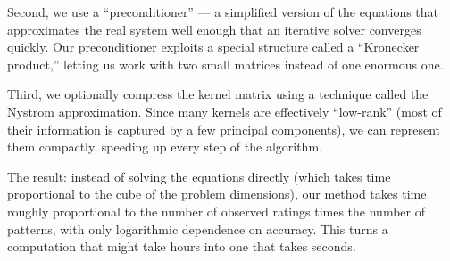 Second, we use a ``preconditioner'' --- a simplified version of the equations that
approximates the real system well enough that an iterative solver converges quickly.
Our preconditioner exploits a special structure called a ``Kronecker product,''
letting us work with two small matrices instead of one enormous one.

Third, we optionally compress the kernel matrix using a technique called the
Nystrom approximation. Since many kernels are effectively ``low-rank'' (most of
their information is captured by a few principal components), we can represent
them compactly, speeding up every step of the algorithm.

The result: instead of solving the equations directly (which takes time
proportional to the cube of the problem dimensions), our method takes time
roughly proportional to the number of observed ratings times the number of
patterns, with only logarithmic dependence on accuracy. This turns a computation
that might take hours into one that takes seconds.
